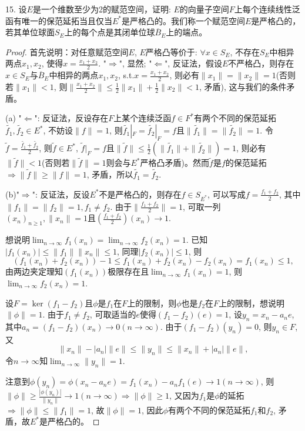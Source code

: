 \documentclass[a4paper,8pt]{ctexart}\textwidth 140mm \textheight 216mm
\newcommand{\8}{\infty}
\newcommand{\RA}{\Rightarrow}
\newcommand{\LA}{\Leftarrow}
\begin{document}
15. 设$E$是一个维数至少为2的赋范空间，证明: $E$的向量子空间$F$上每个连续线性泛函有唯一的保范延拓当且仅当$E^*$是严格凸的。我们称一个赋范空间$E$是严格凸的，若其单位球面$S_E$上的每个点是其闭单位球$\overline{B}_E$上的端点。
\begin{proof}
	首先说明：对任意赋范空间$E$, $E$严格凸等价于: $\forall x\in S_E$, 不存在$S_E$中相异两点$x_1,x_2$, 使得$x=\frac{x_1+x_2}{2}$. "$\RA$", 显然; "$\LA$", 反证法，假设$E$不严格凸，则存在$x\in S_E$与$\overline{B}_E$中相异的两点$x_1,x_2$, s.t.$x=\frac{x_1+x_2}{2}$, 则必有$\|x_1\|=\|x_2\|=1$(否则若$\|x_1\|<1$, 则$\|\frac{x_1+x_2}{2}\|\leq\frac{1}{2}\|x_1\|+\frac{1}{2}\|x_2\|<1$, 矛盾), 这与我们的条件矛盾。
	
	(a) "$\LA$": 反证法，反设存在$F$上某个连续泛函$f\in F^*$有两个不同的保范延拓$\tilde{f_1},\tilde{f_2}\in E^*$, 不妨设$\|f\|=1$,  则$\tilde{f_1}|_F=\tilde{f_2}|_F=f$且$\|\tilde{f_1}\|=\|\tilde{f_2}\|=1$. 令$\tilde{f}=\frac{\tilde{f_1}+\tilde{f_2}}{2}$, 则$\tilde{f}\in E^*$, $\tilde{f}|_F=f$且$\|\tilde{f}\|\leq\frac{1}{2}(\|\tilde{f_1}\|+\|\tilde{f_2}\|)=1$, 则必有$\|\tilde{f}\|<1$(否则若$\|\tilde{f}\|=1$则会与$E^*$严格凸矛盾)。然而$\tilde{f}$是$f$的保范延拓$\RA\|\tilde{f}\|\geq\|f\|=1$, 矛盾，所以$\tilde{f_1}=\tilde{f_2}$.
	
	(b)"$\RA$": 反证法，反设$E^*$不是严格凸的，则存在$f\in S_{E^*}$, 可以写成$f=\frac{f_1+f_2}{2}$, 其中$\|f_1\|=\|f_2\|=1,f_1\ne f_2$. 由于$\|\frac{f_1+f_2}{2}\|=1$, 可取一列$(x_n)_{n\geq 1},\|x_n\|=1$且$\left(\frac{f_1+f_2}{2}\right)(x_n)\to 1$. 
	
	想说明$\lim_{n\to\infty}f_1(x_n)=\lim_{n\to\infty}f_2(x_n)=1$. 已知$|f_1(x_n)|\leq\|f_1\|\|x_n\|\leq 1$, 同理$|f_2(x_n)|\leq 1$, 
	则
	\begin{equation*}
	(f_1(x_n)+f_2(x_n))-1\leq f_1(x_n)+f_2(x_n)-f_2(x_n)=f_1(x_n)\leq 1,
	\end{equation*} 
	由两边夹定理知$(f_1(x_n))$极限存在且$\lim_{n\to\infty}f_1(x_n)=1$, 则$\lim_{n\to\infty}f_2(x_n)=1$. 
	
	设$F=\ker(f_1-f_2)$且$\phi$是$f_1$在$F$上的限制，则$\phi$也是$f_2$在$F$上的限制，想说明$\|\phi\|=1$. 由于$f_1\ne f_2$, 可取适当的$e$使得$(f_1-f_2)(e)=1$, 设$y_n=x_n-a_ne$, 其中$a_n=(f_1-f_2)(x_n)\to 0(n\to\infty)$. 由于$(f_1-f_2)(y_n)=0$, 则$y_n\in F$, 又
	$$\|x_n\|-|a_n|\|e\|\leq \|y_n\|\leq \|x_n\|+|a_n|\|e\|,$$
	令$n\to\infty$知$\lim_{n\to\infty}\|y_n\|=1$.  
	
	注意到$\phi(y_n)=\phi(x_n-a_ne)=f_1(x_n)-a_nf_1(e)\to 1(n\to\infty)$, 则$\|\phi\|\geq \frac{|\phi(y_n)|}{\|y_n\|}\to 1(n\to\infty)\RA \|\phi\|\geq 1$, 又因为$f_1$是$\phi$的延拓$\RA\|\phi\|\leq\|f_1\|=1$, 故$\|\phi\|=1$, 因此$\phi$有两个不同的保范延拓$f_1$和$f_2$, 矛盾，故$E^*$是严格凸的。
\end{proof}
\end{document}
